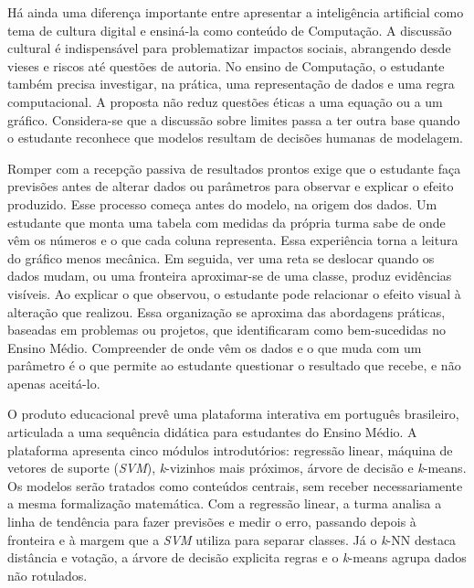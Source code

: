 Há ainda uma diferença importante entre apresentar a inteligência artificial como tema de cultura digital e ensiná-la como conteúdo de Computação. A discussão cultural é indispensável para problematizar impactos sociais, abrangendo desde vieses e riscos até questões de autoria. No ensino de Computação, o estudante também precisa investigar, na prática, uma representação de dados e uma regra computacional. A proposta não reduz questões éticas a uma equação ou a um gráfico. Considera-se que a discussão sobre limites passa a ter outra base quando o estudante reconhece que modelos resultam de decisões humanas de modelagem.

Romper com a recepção passiva de resultados prontos exige que o estudante faça previsões antes de alterar dados ou parâmetros para observar e explicar o efeito produzido. Esse processo começa antes do modelo, na origem dos dados. Um estudante que monta uma tabela com medidas da própria turma sabe de onde vêm os números e o que cada coluna representa. Essa experiência torna a leitura do gráfico menos mecânica. Em seguida, ver uma reta se deslocar quando os dados mudam, ou uma fronteira aproximar-se de uma classe, produz evidências visíveis. Ao explicar o que observou, o estudante pode relacionar o efeito visual à alteração que realizou. Essa organização se aproxima das abordagens práticas, baseadas em problemas ou projetos, que  identificaram como bem-sucedidas no Ensino Médio. Compreender de onde vêm os dados e o que muda com um parâmetro é o que permite ao estudante questionar o resultado que recebe, e não apenas aceitá-lo.

O produto educacional prevê uma plataforma interativa em português brasileiro, articulada a uma sequência didática para estudantes do Ensino Médio. A plataforma apresenta cinco módulos introdutórios: regressão linear, máquina de vetores de suporte (\textit{SVM}), \textit{k}-vizinhos mais próximos, árvore de decisão e \textit{k}-means. Os modelos serão tratados como conteúdos centrais, sem receber necessariamente a mesma formalização matemática. Com a regressão linear, a turma analisa a linha de tendência para fazer previsões e medir o erro, passando depois à fronteira e à margem que a \textit{SVM} utiliza para separar classes. Já o \textit{k}-NN destaca distância e votação, a árvore de decisão explicita regras e o \textit{k}-means agrupa dados não rotulados.

